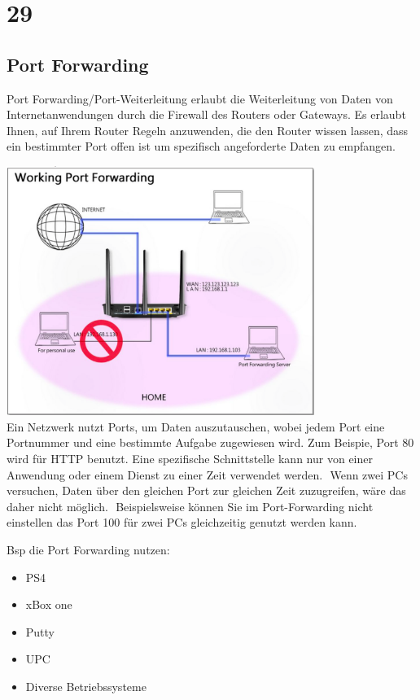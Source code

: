 \documentclass[12pt, a4paper]{article}
\begin{document}
	\newpage
	
	\section*{29}
	\subsection*{Port Forwarding}

	Port Forwarding/Port-Weiterleitung erlaubt die Weiterleitung von Daten von Internetanwendungen durch die Firewall des Routers oder Gateways.  Es erlaubt Ihnen, auf Ihrem Router Regeln anzuwenden, die den Router wissen lassen, dass ein bestimmter Port offen ist um spezifisch angeforderte Daten zu empfangen.  

	\includegraphics[width=10cm]{port.png}\\
	
	Ein Netzwerk nutzt Ports, um Daten auszutauschen, wobei jedem Port eine Portnummer und eine bestimmte Aufgabe zugewiesen wird. Zum Beispie, Port 80 wird für HTTP benutzt. Eine spezifische Schnittstelle kann nur von einer Anwendung oder einem Dienst zu einer Zeit verwendet werden.  Wenn zwei PCs versuchen, Daten über den gleichen Port zur gleichen Zeit zuzugreifen, wäre das daher nicht möglich.  Beispielsweise können Sie im Port-Forwarding nicht einstellen das Port 100 für zwei PCs gleichzeitig genutzt werden kann.

	Bsp die Port Forwarding nutzen:
 	\begin{itemize}
 	\item PS4
 	\item xBox one
 	\item Putty
 	\item UPC
 	\item Diverse Betriebssysteme
	\end{itemize}
	
\end{document}
